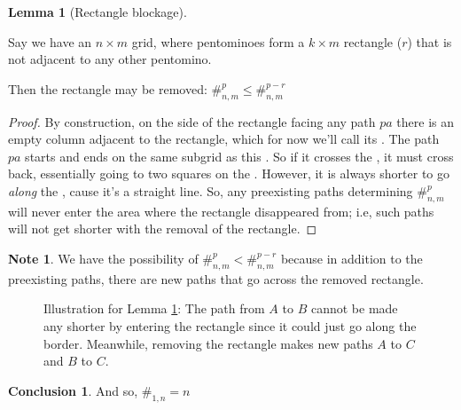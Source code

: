 \documentclass{article}
\theoremstyle{definition} %
\newtheorem{lemma}[theorem]{Lemma}
\newtheorem*{conclusion}{Conclusion}
\newtheorem*{note}{Note}
\newcommand{\newterm}[1]{\textit{#1}}
\newcommand{\badterm}[1]{\textcolor{red}{\uwave{\textcolor{black}{#1}}}}
\begin{document}
\begin{lemma}[Rectangle blockage]
\label{lem:RectangleBlock}

Say we have an $n \times m$ grid, where pentominoes form a $k \times m$ rectangle ($r$) that is not adjacent to any other pentomino.

Then the rectangle may be removed: $\#^{p}_{n, m} \le \#^{p - r}_{n, m}$
\end{lemma}

\begin{proof}
By construction, on the side of the rectangle facing any path $pa$ there is an empty column adjacent to the rectangle, which for now we'll call its \newterm{\badterm{border}}. The path $pa$ starts and ends on the same subgrid as this \badterm{border}. So if it crosses the \badterm{border}, it must cross back, essentially going to two squares on the \badterm{border}. However, it is always shorter to go \emph{along} the \badterm{border}, cause it's a straight line. So, any preexisting paths determining $\#^{p}_{n, m}$ will never enter the area where the rectangle disappeared from; i.e, such paths will not get shorter with the removal of the rectangle.
\end{proof}

\begin{note}
We have the possibility of $\#^{p}_{n, m} < \#^{p - r}_{n, m}$ because in addition to the preexisting paths, there are new paths that go across the removed rectangle.
\end{note}

\begin{figure}[!h]
    \centering
    \caption{Illustration for Lemma \ref{lem:RectangleBlock}: The path from $A$ to $B$ cannot be made any shorter by entering the rectangle since it could just go along the border. Meanwhile, removing the rectangle makes new paths $A$ to $C$ and $B$ to $C$.}
\end{figure}

\begin{conclusion}
And so, $\#_{1, n} = n$
\end{conclusion}
\end{document}
